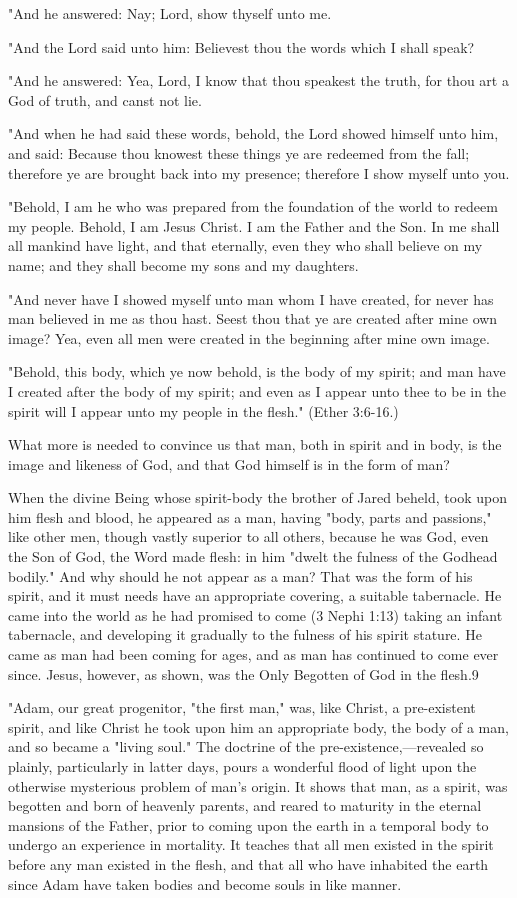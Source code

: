 "And he answered: Nay; Lord, show thyself unto me.

"And the Lord said unto him: Believest thou the words which I shall speak?

"And he answered: Yea, Lord, I know that thou speakest the truth, for thou art a God of truth,
and canst not lie.

"And when he had said these words, behold, the Lord showed himself unto him, and said:
Because thou knowest these things ye are redeemed from the fall; therefore ye are brought
back into my presence; therefore I show myself unto you.

"Behold, I am he who was prepared from the foundation of the world to redeem my people.
Behold, I am Jesus Christ. I am the Father and the Son. In me shall all mankind have light,
and that eternally, even they who shall believe on my name; and they shall become my sons
and my daughters.

"And never have I showed myself unto man whom I have created, for never has man
believed in me as thou hast. Seest thou that ye are created after mine own image? Yea, even
all men were created in the beginning after mine own image.

"Behold, this body, which ye now behold, is the body of my spirit; and man have I created
after the body of my spirit; and even as I appear unto thee to be in the spirit will I appear unto
my people in the flesh." (Ether 3:6-16.)

What more is needed to convince us that man, both in spirit and in body, is the image and
likeness of God, and that God himself is in the form of man?

When the divine Being whose spirit-body the brother of Jared beheld, took upon him flesh
and blood, he appeared as a man, having "body, parts and passions," like other men, though
vastly superior to all others, because he was God, even the Son of God, the Word made flesh:
in him "dwelt the fulness of the Godhead bodily." And why should he not appear as a man?
That was the form of his spirit, and it must needs have an appropriate covering, a suitable
tabernacle. He came into the world as he had promised to come (3 Nephi 1:13) taking an
infant tabernacle, and developing it gradually to the fulness of his spirit stature. He came as
man had been coming for ages, and as man has continued to come ever since. Jesus,
however, as shown, was the Only Begotten of God in the flesh.9

"Adam, our great progenitor, "the first man," was, like Christ, a pre-existent spirit, and like
Christ he took upon him an appropriate body, the body of a man, and so became a "living
soul." The doctrine of the pre-existence,—revealed so plainly, particularly in latter days,
pours a wonderful flood of light upon the otherwise mysterious problem of man's origin. It
shows that man, as a spirit, was begotten and born of heavenly parents, and reared to
maturity in the eternal mansions of the Father, prior to coming upon the earth in a temporal
body to undergo an experience in mortality. It teaches that all men existed in the spirit before
any man existed in the flesh, and that all who have inhabited the earth since Adam have taken
bodies and become souls in like manner.

